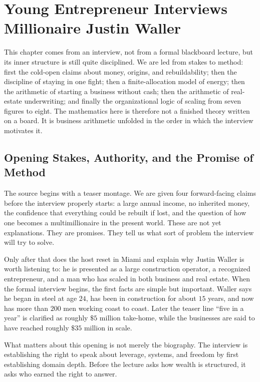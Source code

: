 \chapter{Young Entrepreneur Interviews Millionaire Justin Waller}

This chapter comes from an interview, not from a formal blackboard lecture, but its inner structure is still quite disciplined. We are led from stakes to method: first the cold-open claims about money, origins, and rebuildability; then the discipline of staying in one fight; then a finite-allocation model of energy; then the arithmetic of starting a business without cash; then the arithmetic of real-estate underwriting; and finally the organizational logic of scaling from seven figures to eight. The mathematics here is therefore not a finished theory written on a board. It is business arithmetic unfolded in the order in which the interview motivates it.

\section{Opening Stakes, Authority, and the Promise of Method}

The source begins with a teaser montage. We are given four forward-facing claims before the interview properly starts: a large annual income, no inherited money, the confidence that everything could be rebuilt if lost, and the question of how one becomes a multimillionaire in the present world. These are not yet explanations. They are promises. They tell us what sort of problem the interview will try to solve.

Only after that does the host reset in Miami and explain why Justin Waller is worth listening to: he is presented as a large construction operator, a recognized entrepreneur, and a man who has scaled in both business and real estate. When the formal interview begins, the first facts are simple but important. Waller says he began in steel at age \(24\), has been in construction for about \(15\) years, and now has more than \(200\) men working coast to coast. Later the teaser line ``five in a year'' is clarified as roughly \(\$5\) million take-home, while the businesses are said to have reached roughly \(\$35\) million in scale.

What matters about this opening is not merely the biography. The interview is establishing the right to speak about leverage, systems, and freedom by first establishing domain depth. Before the lecture asks how wealth is structured, it asks who earned the right to answer.

